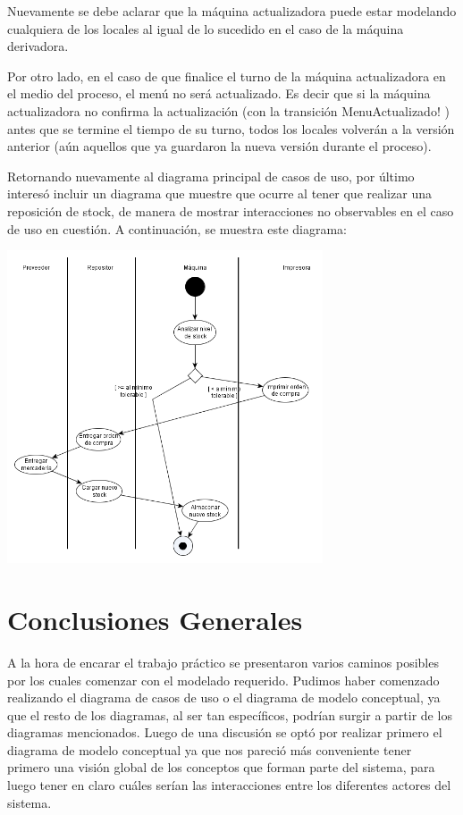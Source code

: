 \documentclass[a4paper,11pt] {article}
\begin{document}
Nuevamente se debe aclarar que la m\'aquina actualizadora puede estar modelando cualquiera de los locales al igual de lo sucedido en el caso de la m\'aquina derivadora.

Por otro lado, en el caso de que finalice el turno de la m\'aquina actualizadora en el medio del proceso, el men\'u no ser\'a actualizado. Es decir que si la m\'aquina actualizadora no confirma la actualizaci\'on (con la transici\'on MenuActualizado! ) antes que se termine el tiempo de su turno, todos los locales volver\'an a la versi\'on anterior (a\'un aquellos que ya guardaron la nueva versi\'on durante el proceso).

Retornando nuevamente al diagrama principal de casos de uso, por \'ultimo interes\'o incluir un diagrama que muestre que ocurre al tener que realizar una reposici\'on de stock, de manera de mostrar interacciones no observables en el caso de uso en cuesti\'on. A continuaci\'on, se muestra este diagrama:

\begin{center}
 \includegraphics[width=0.7\textwidth]{Diagramas/DiagramaActividadReponerStock.png}
\end{center}

\section*{Conclusiones Generales}

A la hora de encarar el trabajo pr\'actico se presentaron varios caminos posibles por los cuales
comenzar con el modelado requerido. Pudimos haber comenzado realizando el diagrama de
casos de uso o el diagrama de modelo conceptual, ya que el resto de los diagramas, al ser tan espec\'ificos, podr\'ian surgir a partir de los diagramas mencionados. Luego de una discusi\'on se opt\'o por realizar primero el diagrama de modelo conceptual ya que nos pareci\'o m\'as conveniente tener primero una visi\'on global de los conceptos que forman parte del sistema, para luego tener en claro cu\'ales ser\'ian las interacciones entre los diferentes actores del sistema.
\end{document}
